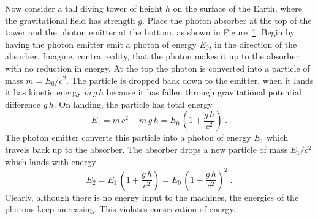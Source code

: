 \begin{figure}
\vspace{2in}
\caption[An experiment to demonstrate gravitational redshift]{}
\label{fig:tower}
\end{figure}
Now consider a tall diving tower of height $h$ on the surface of the
Earth, where the gravitational field has strength $g$.  Place the
photon absorber at the top of the tower and the photon emitter at the
bottom, as shown in Figure~\ref{fig:tower}.  Begin by having the
photon emitter emit a photon of energy $E_0$, in the direction of the
absorber.  Imagine, contra reality, that the photon makes it up to the
absorber with no reduction in energy.  At the top the photon is
converted into a particle of mass $m=E_0/c^2$.  The particle is
dropped back down to the emitter, when it lands it has kinetic energy
$m\,g\,h$ because it has fallen through gravitational potential
difference $g\,h$.  On landing, the particle has total energy
\begin{equation}
E_1 = m\,c^2 + m\,g\,h = E_0\,\left(1+\frac{g\,h}{c^2}\right) \;.
\end{equation}
The photon emitter converts this particle into a photon of energy
$E_1$ which travels back up to the absorber.  The absorber drops a new
particle of mass $E_1/c^2$ which lands with energy
\begin{equation}
E_2 = E_1\,\left(1+\frac{g\,h}{c^2}\right)
= E_0\,\left(1+\frac{g\,h}{c^2}\right)^2 \;.
\end{equation}
Clearly, although there is no energy input to the machines, the
energies of the photons keep increasing.  This violates conservation
of energy.

